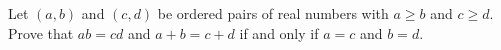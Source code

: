 Let $(a,b)$ and $(c,d)$ be ordered pairs of real numbers with $a\ge b$ and $c\ge d$. Prove that $ab=cd$ and $a+b=c+d$ if and only if $a=c$ and $b=d$.
